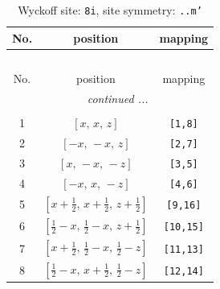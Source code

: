 \documentclass[fleqn,8pt]{jsarticle}
\begin{document}
\begin{longtable}{ccc}
\caption{Wyckoff site: {\tt 8i}, site symmetry: {\tt ..m'}}
 \\
 \hline \hline
No. & position & mapping \\ \hline \endfirsthead

\multicolumn{2}{l}{\tablename\ \thetable{}} \\
 \hline \hline
No. & position & mapping \\ \hline \endhead

 \hline \hline
\multicolumn{2}{r}{\footnotesize\it continued ...} \\ \endfoot

 \hline \hline
\multicolumn{2}{r}{} \\ \endlastfoot

1 & $\left[ x,\, x,\, z \right]$ & {\tt [1,8]} \\ \hline
2 & $\left[ - x,\, - x,\, z \right]$ & {\tt [2,7]} \\ \hline
3 & $\left[ x,\, - x,\, - z \right]$ & {\tt [3,5]} \\ \hline
4 & $\left[ - x,\, x,\, - z \right]$ & {\tt [4,6]} \\ \hline
5 & $\left[ x + \frac{1}{2},\, x + \frac{1}{2},\, z + \frac{1}{2} \right]$ & {\tt [9,16]} \\ \hline
6 & $\left[ \frac{1}{2} - x,\, \frac{1}{2} - x,\, z + \frac{1}{2} \right]$ & {\tt [10,15]} \\ \hline
7 & $\left[ x + \frac{1}{2},\, \frac{1}{2} - x,\, \frac{1}{2} - z \right]$ & {\tt [11,13]} \\ \hline
8 & $\left[ \frac{1}{2} - x,\, x + \frac{1}{2},\, \frac{1}{2} - z \right]$ & {\tt [12,14]} \\
\end{longtable}
\renewcommand{\arraystretch}{1.2}
\end{document}

